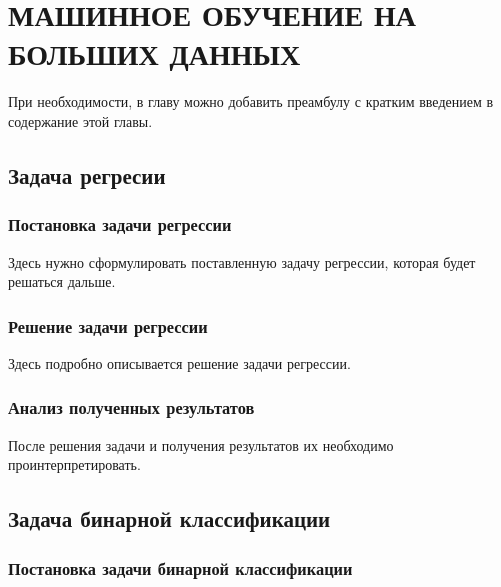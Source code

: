 %
\chapter{\MakeUppercase{Машинное обучение на больших данных}}\label{ch:second}

\vspace{\baselineskip}
При необходимости, в главу можно добавить преамбулу с кратким введением в содержание этой главы.
\vspace{\baselineskip}

\section{Задача регресии}
\subsection{Постановка задачи регрессии}\vspace{\baselineskip}

Здесь нужно сформулировать поставленную задачу регрессии, которая будет решаться дальше.

\vspace{\baselineskip}\subsection{Решение задачи регрессии}\vspace{\baselineskip}

Здесь подробно описывается решение задачи регрессии.

\vspace{\baselineskip}\subsection{Анализ полученных результатов}\vspace{\baselineskip}

После решения задачи и получения результатов их необходимо проинтерпретировать.

\vspace{\baselineskip}\section{Задача бинарной классификации}
\subsection{Постановка задачи бинарной классификации}\vspace{\baselineskip}

